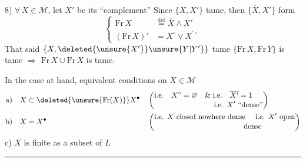 8) $\forall\,X\in\mathcal M$, let $X'$ be its ``complement''  Since $\{X,X'\}$ tame, then $\{\overline X,\overline{X'}\}$   form
\[
\left\{\begin{aligned}
\mathrm{Fr}\,X &\overset{\text{def}}{=} \overline X\wedge\overline{X'}\\
(\mathrm{Fr}\,X)' &= X^{\circ}\vee X^{\prime\circ}
\end{aligned}\right.
\]
That said $\{X,\deleted{\unsure{X'}}\unsure{Y|Y'}\}$ tame  $\{\mathrm{Fr}\,X,\mathrm{Fr}\,Y\}$ is tame $\Longrightarrow$ $\mathrm{Fr}\,X\cup\mathrm{Fr}\,X$ is tame.

   

In the case at hand, equivalent conditions on $X\in\mathcal M$
\[
\begin{aligned}
\text{a)}\quad & X\subset\deleted{\unsure{\mathrm{Fr}(X)}}X^{\bullet}
&&\left(\begin{aligned}&\text{i.e.}\quad X^{\circ}=\varnothing\quad\&\ \text{i.e.}\quad\overline{X'}=1\\[-2pt]&\hspace{8em}\text{i.e. }X'\text{ ``dense''}\end{aligned}\right)\\
\text{b)}\quad & X=X^{\bullet}
&&\left(\begin{aligned}&\text{i.e. }X\text{ closed nowhere dense \quad i.e. }X'\text{ open}\\[-2pt]&\hspace{12em}\text{dense}\end{aligned}\right)
\end{aligned}
\]
c) $X$ is finite as a subset of $L$

\begin{center}\rule{1.6cm}{0.45pt}\end{center}


